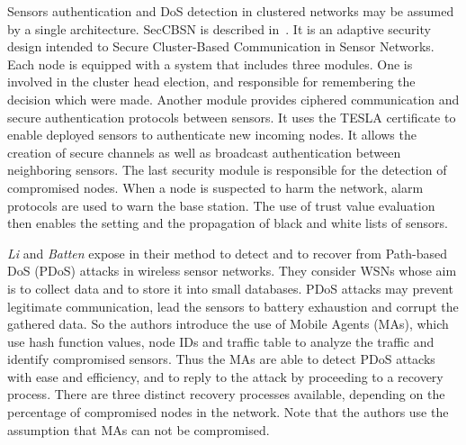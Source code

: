 Sensors authentication and DoS detection in clustered networks may be assumed by a single architecture.
SecCBSN is described in~\cite{HHC07}.
It is an adaptive security design intended to Secure Cluster-Based Communication in Sensor Networks.
Each node is equipped with a system that includes three modules.
One is involved in the cluster head election, and responsible for remembering the decision which were made.
Another module provides ciphered communication and secure authentication protocols between sensors.
It uses the TESLA certificate to enable deployed sensors to authenticate new incoming nodes.
It allows the creation of secure channels as well as broadcast authentication between neighboring sensors.
The last security module is responsible for the detection of compromised nodes.
When a node is suspected to harm the network, alarm protocols are used to warn the base station.
The use of trust value evaluation then enables the setting and the propagation of black and white lists of sensors.




\textit{Li} and \textit{Batten} expose in
\cite{LB09}
their method to detect and to recover from Path-based DoS (PDoS) attacks in wireless sensor networks.
They consider WSNs whose aim is to collect data and to store it into small databases.
PDoS attacks may prevent legitimate communication, lead the sensors to battery exhaustion and corrupt the gathered data.
So the authors introduce the use of Mobile Agents (MAs), which use hash function values, node IDs and traffic table to analyze the traffic and identify compromised sensors.
Thus the MAs are able to detect PDoS attacks with ease and efficiency, and to reply to the attack by proceeding to a recovery process.
There are three distinct recovery processes available, depending on the percentage of compromised nodes in the network.
Note that the authors use the assumption that MAs can not be compromised.


